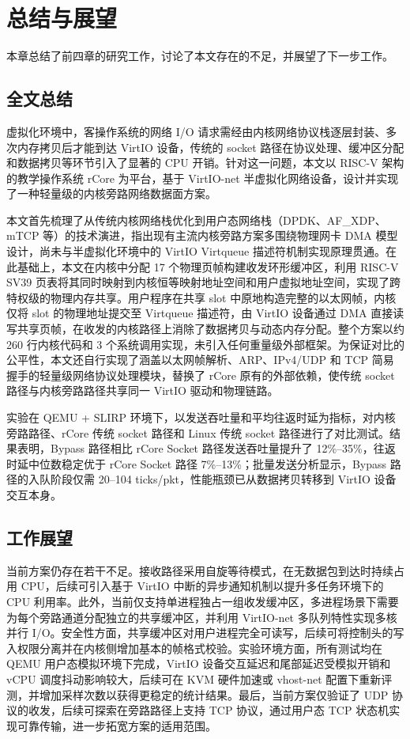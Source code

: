 \chapter{总结与展望}
\label{cha:conclusion}

本章总结了前四章的研究工作，讨论了本文存在的不足，并展望了下一步工作。

\section{全文总结}

虚拟化环境中，客操作系统的网络 I/O 请求需经由内核网络协议栈逐层封装、多次内存拷贝后才能到达 VirtIO 设备，传统的 socket 路径在协议处理、缓冲区分配和数据拷贝等环节引入了显著的 CPU 开销。针对这一问题，本文以 RISC-V 架构的教学操作系统 rCore 为平台，基于 VirtIO-net 半虚拟化网络设备，设计并实现了一种轻量级的内核旁路网络数据面方案。

本文首先梳理了从传统内核网络栈优化到用户态网络栈（DPDK、AF\_XDP、mTCP 等）的技术演进，指出现有主流内核旁路方案多围绕物理网卡 DMA 模型设计，尚未与半虚拟化环境中的 VirtIO Virtqueue 描述符机制实现原理贯通。在此基础上，本文在内核中分配 17 个物理页帧构建收发环形缓冲区，利用 RISC-V SV39 页表将其同时映射到内核恒等映射地址空间和用户虚拟地址空间，实现了跨特权级的物理内存共享。用户程序在共享 slot 中原地构造完整的以太网帧，内核仅将 slot 的物理地址提交至 Virtqueue 描述符，由 VirtIO 设备通过 DMA 直接读写共享页帧，在收发的内核路径上消除了数据拷贝与动态内存分配。整个方案以约 260 行内核代码和 3 个系统调用实现，未引入任何重量级外部框架。为保证对比的公平性，本文还自行实现了涵盖以太网帧解析、ARP、IPv4/UDP 和 TCP 简易握手的轻量级网络协议处理模块，替换了 rCore 原有的外部依赖，使传统 socket 路径与内核旁路路径共享同一 VirtIO 驱动和物理链路。

实验在 QEMU + SLIRP 环境下，以发送吞吐量和平均往返时延为指标，对内核旁路路径、rCore 传统 socket 路径和 Linux 传统 socket 路径进行了对比测试。结果表明，Bypass 路径相比 rCore Socket 路径发送吞吐量提升了 12\%--35\%，往返时延中位数稳定优于 rCore Socket 路径 7\%--13\%；批量发送分析显示，Bypass 路径的入队阶段仅需 20--104 ticks/pkt，性能瓶颈已从数据拷贝转移到 VirtIO 设备交互本身。

\section{工作展望}

当前方案仍存在若干不足。接收路径采用自旋等待模式，在无数据包到达时持续占用 CPU，后续可引入基于 VirtIO 中断的异步通知机制以提升多任务环境下的 CPU 利用率。此外，当前仅支持单进程独占一组收发缓冲区，多进程场景下需要为每个旁路通道分配独立的共享缓冲区，并利用 VirtIO-net 多队列特性实现多核并行 I/O。安全性方面，共享缓冲区对用户进程完全可读写，后续可将控制头的写入权限分离并在内核侧增加基本的帧格式校验。实验环境方面，所有测试均在 QEMU 用户态模拟环境下完成，VirtIO 设备交互延迟和尾部延迟受模拟开销和 vCPU 调度抖动影响较大，后续可在 KVM 硬件加速或 vhost-net 配置下重新评测，并增加采样次数以获得更稳定的统计结果。最后，当前方案仅验证了 UDP 协议的收发，后续可探索在旁路路径上支持 TCP 协议，通过用户态 TCP 状态机实现可靠传输，进一步拓宽方案的适用范围。

